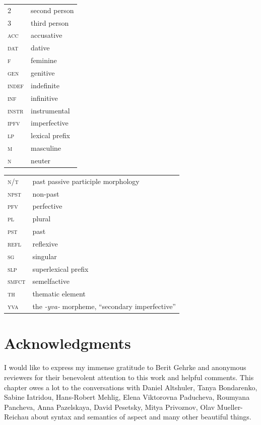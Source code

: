 \documentclass[output=paper,colorlinks,citecolor=brown]{langscibook}
\begin{document}
\begin{tabularx}{.5\textwidth}{@{}lQ}
\textsc{2}&second person\\
\textsc{3}&third person\\
\textsc{acc}&accusative\\
\textsc{dat}&dative\\
\textsc{f}&feminine\\
\textsc{gen}&genitive\\
\textsc{indef}&indefinite\\
\textsc{inf}&infinitive\\
\textsc{instr}&instrumental\\
\textsc{ipfv}&imperfective\\
\textsc{lp}&lexical prefix\\
\textsc{m}&masculine\\
\textsc{n}&neuter\\
\end{tabularx}%
\begin{tabularx}{.5\textwidth}{lQ@{}}
\textsc{n/t}&past passive participle morphology\\
\textsc{npst}&non-past\\
\textsc{pfv}&perfective\\
\textsc{pl}&plural\\
\textsc{pst}&past\\
\textsc{refl}&reflexive\\
\textsc{sg}&singular\\
\textsc{slp}&superlexical prefix\\
\textsc{smfct}&semelfactive\\
\textsc{th}&thematic element\\
\textsc{yva}&the \textit{-yva-} morpheme, ``secondary imperfective''\\
\end{tabularx}

\section*{Acknowledgments}

I would like to express my immense gratitude to Berit Gehrke and anonymous reviewers for their benevolent attention to this work and helpful comments. This chapter owes a lot to the conversations with Daniel Altshuler, Tanya Bondarenko, Sabine Iatridou, Hans-Robert Mehlig, Elena Viktorovna Paducheva, Rou\-my\-ana Pancheva, Anna Pazelskaya, David Pesetsky, Mitya Privoznov, Olav Muel\-ler-Reichau about syntax and semantics of aspect and many other beautiful things. 

\sloppy\printbibliography[heading=subbibliography,notkeyword=this]
\end{document}
